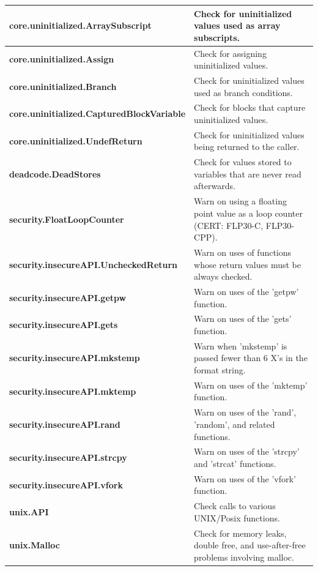 {\begin{longtable}{||p{}|p{}||}
    \\
    \hline
    \textbf{core.uninitialized.ArraySubscript}
& Check for uninitialized values used as array subscripts.
    \\
    \hline
    \textbf{core.uninitialized.Assign}
& Check for assigning uninitialized values.
    \\
    \hline
    \textbf{core.uninitialized.Branch}
& Check for uninitialized values used as branch conditions.
    \\
    \hline
    \textbf{core.uninitialized.CapturedBlockVariable}
& Check for blocks that capture uninitialized values.
    \\
    \hline
    \textbf{core.uninitialized.UndefReturn}
& Check for uninitialized values being returned to the caller.
    \\
    \hline
    \textbf{deadcode.DeadStores}
& Check for values stored to variables that are never read afterwards.
    \\
    \hline
    \textbf{security.FloatLoopCounter}
& Warn on using a floating point value as a loop counter (CERT: FLP30-C, FLP30-CPP).
    \\
    \hline
    \textbf{security.insecureAPI.UncheckedReturn}
& Warn on uses of functions whose return values must be always checked.
    \\
    \hline
    \textbf{security.insecureAPI.getpw}
& Warn on uses of the 'getpw' function.
    \\
    \hline
    \textbf{security.insecureAPI.gets}
& Warn on uses of the 'gets' function.
    \\
    \hline
    \textbf{security.insecureAPI.mkstemp}
& Warn when 'mkstemp' is passed fewer than 6 X's in the format string.
    \\
    \hline
    \textbf{security.insecureAPI.mktemp}
& Warn on uses of the 'mktemp' function.
    \\
    \hline
    \textbf{security.insecureAPI.rand}
& Warn on uses of the 'rand', 'random', and related functions.
    \\
    \hline
    \textbf{security.insecureAPI.strcpy}
& Warn on uses of the 'strcpy' and 'strcat' functions.
    \\
    \hline
    \textbf{security.insecureAPI.vfork}
& Warn on uses of the 'vfork' function.
    \\
    \hline
    \textbf{unix.API}
& Check calls to various UNIX/Posix functions.
    \\
    \hline
    \textbf{unix.Malloc}
& Check for memory leaks, double free, and use-after-free problems involving malloc.

\end{longtable}}
